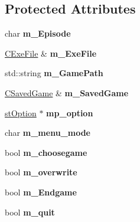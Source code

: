 \subsection*{Protected Attributes}
\begin{DoxyCompactItemize}
\item 
\hypertarget{class_c_menu_a95a8cabde2bf8bc8adb40b6eaffff9df}{
char {\bfseries m\_\-Episode}}
\label{class_c_menu_a95a8cabde2bf8bc8adb40b6eaffff9df}

\item 
\hypertarget{class_c_menu_af937c69762d85d85d58d75b73f845fb0}{
\hyperlink{class_c_exe_file}{CExeFile} \& {\bfseries m\_\-ExeFile}}
\label{class_c_menu_af937c69762d85d85d58d75b73f845fb0}

\item 
\hypertarget{class_c_menu_a584b1af0698857818902c3422bb73567}{
std::string {\bfseries m\_\-GamePath}}
\label{class_c_menu_a584b1af0698857818902c3422bb73567}

\item 
\hypertarget{class_c_menu_a6971ec95d5bc9f6ff48d8098f21a94a4}{
\hyperlink{class_c_saved_game}{CSavedGame} \& {\bfseries m\_\-SavedGame}}
\label{class_c_menu_a6971ec95d5bc9f6ff48d8098f21a94a4}

\item 
\hypertarget{class_c_menu_a18c91d4e5fb8ddf33c916c74a635c4a8}{
\hyperlink{structst_option}{stOption} $\ast$ {\bfseries mp\_\-option}}
\label{class_c_menu_a18c91d4e5fb8ddf33c916c74a635c4a8}

\item 
\hypertarget{class_c_menu_adce511af972c35325e1e3a340cd796d5}{
char {\bfseries m\_\-menu\_\-mode}}
\label{class_c_menu_adce511af972c35325e1e3a340cd796d5}

\item 
\hypertarget{class_c_menu_a86e2fb66ba2b4b10e3562bed35fd6226}{
bool {\bfseries m\_\-choosegame}}
\label{class_c_menu_a86e2fb66ba2b4b10e3562bed35fd6226}

\item 
\hypertarget{class_c_menu_aeaf53f1a44d41287c617493b39b2e04e}{
bool {\bfseries m\_\-overwrite}}
\label{class_c_menu_aeaf53f1a44d41287c617493b39b2e04e}

\item 
\hypertarget{class_c_menu_a59f3d4022bb1d3e14d648b3b14490a54}{
bool {\bfseries m\_\-Endgame}}
\label{class_c_menu_a59f3d4022bb1d3e14d648b3b14490a54}

\item 
\hypertarget{class_c_menu_a4459ec865ef91e11614824bdccab7c8f}{
bool {\bfseries m\_\-quit}}
\label{class_c_menu_a4459ec865ef91e11614824bdccab7c8f}


\end{DoxyCompactItemize}
